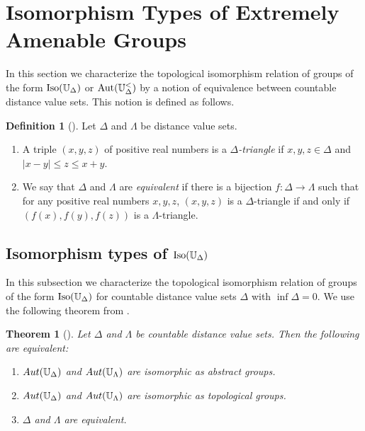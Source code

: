 \documentclass{amsart}
\newtheorem{theorem}{Theorem}[section]
\theoremstyle{definition}
\newtheorem{definition}{Definition}[section]
\theoremstyle{remark}
\begin{document}
\section{Isomorphism Types of Extremely Amenable Groups\label{sec:5}}

In this section we characterize the topological isomorphism relation of groups of the form $\mbox{\rm Iso}(\mathbb{U}_\Delta)$ or $\mbox{\rm Aut}(\mathbb{U}^<_{\Delta})$ by a notion of equivalence between countable distance value sets. This notion is defined as follows.

\begin{definition}[\cite{EGLMM}]\label{def:CDVSequiv} Let $\Delta$ and $\Lambda$ be distance value sets. 
\begin{enumerate}
\item[(i)] A triple $(x,y,z)$ of positive real numbers is a {\em $\Delta$-triangle} if $x,y, z\in \Delta$ and $|x-y|\leq z\leq x+y$.
\item[(ii)] We say that $\Delta$ and $\Lambda$ are {\em equivalent} if there is a bijection $f\colon \Delta\to \Lambda$ such that for any positive real numbers $x,y, z$, $(x,y,z)$ is a $\Delta$-triangle if and only if $(f(x), f(y), f(z))$ is a $\Lambda$-triangle.
\end{enumerate}
\end{definition}

\subsection{Isomorphism types of $\mbox{\rm Iso}(\mathbb{U}_\Delta)$} 

In this subsection we characterize the topological isomorphism relation of groups of the form $\mbox{\rm Iso}(\mathbb{U}_\Delta)$ for countable distance value sets $\Delta$ with $\inf\Delta=0$. We use the following theorem from \cite{EGLMM}.

 \begin{theorem}[\cite{EGLMM}]\label{thm:char}
        Let $\Delta$ and $\Lambda$ be countable distance value sets. Then the following are equivalent: 
        \begin{enumerate}
            \item[\rm (i)] ${\rm Aut}(\mathbb{U}_\Delta)$ and ${\rm Aut}(\mathbb{U}_\Lambda)$ are isomorphic as abstract groups.  
            \item[\rm (ii)] ${\rm Aut}(\mathbb{U}_\Delta)$ and ${\rm Aut}(\mathbb{U}_\Lambda)$ are isomorphic as topological groups. 
            \item[\rm (iii)] $\Delta$ and $\Lambda$ are equivalent. 
        \end{enumerate}
    \end{theorem}
\end{document}
